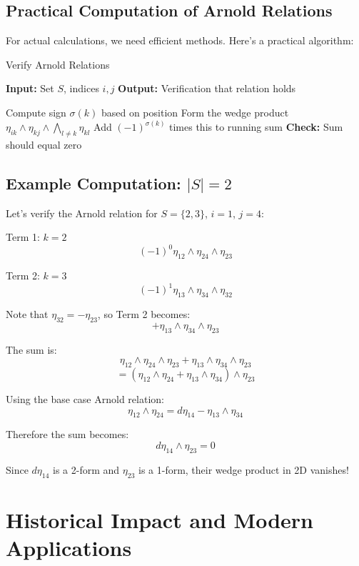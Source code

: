 \subsection{Practical Computation of Arnold Relations}

For actual calculations, we need efficient methods. Here's a practical algorithm:

\begin{algorithm}
\caption{Verify Arnold Relations}
\begin{algorithmic}
\STATE \textbf{Input:} Set $S$, indices $i, j$
\STATE \textbf{Output:} Verification that relation holds

    \STATE Compute sign $\sigma(k)$ based on position
    \STATE Form the wedge product $\eta_{ik} \wedge \eta_{kj} \wedge \bigwedge_{l \neq k} \eta_{kl}$
    \STATE Add $(-1)^{\sigma(k)}$ times this to running sum
\ENDFOR
\STATE \textbf{Check:} Sum should equal zero
\end{algorithmic}
\end{algorithm}

\subsection{Example Computation: $|S| = 2$}

Let's verify the Arnold relation for $S = \{2,3\}$, $i = 1$, $j = 4$:

Term 1: $k = 2$
$$(-1)^0 \eta_{12} \wedge \eta_{24} \wedge \eta_{23}$$

Term 2: $k = 3$
$$(-1)^1 \eta_{13} \wedge \eta_{34} \wedge \eta_{32}$$

Note that $\eta_{32} = -\eta_{23}$, so Term 2 becomes:
$$+\eta_{13} \wedge \eta_{34} \wedge \eta_{23}$$

The sum is:
$$\eta_{12} \wedge \eta_{24} \wedge \eta_{23} + \eta_{13} \wedge \eta_{34} \wedge \eta_{23}$$
$$= (\eta_{12} \wedge \eta_{24} + \eta_{13} \wedge \eta_{34}) \wedge \eta_{23}$$

Using the base case Arnold relation:
$$\eta_{12} \wedge \eta_{24} = d\eta_{14} - \eta_{13} \wedge \eta_{34}$$

Therefore the sum becomes:
$$d\eta_{14} \wedge \eta_{23} = 0$$

Since $d\eta_{14}$ is a 2-form and $\eta_{23}$ is a 1-form, their wedge product in 2D vanishes!

\section{Historical Impact and Modern Applications}

